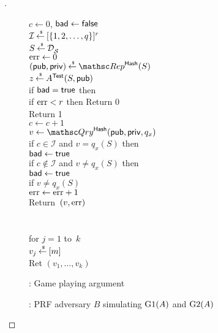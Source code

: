 \begin{proof}[]
\begin{figure}
{{$c\gets 0$, $\mathsf{bad} \gets \mathsf{false}$\\
$\mathcal{I}{\:\stackrel{{\scriptscriptstyle \hspace{0.2em}\$}} {\leftarrow}\:} [\{1,2,\ldots,q\}]^r$\\
$S {\:\stackrel{{\scriptscriptstyle \hspace{0.2em}\$}} {\leftarrow}\:} \mathcal{D}_{{\cal S}}^{}$\\
$\mathrm{err} \gets 0$\\
$(\pubaux,\privaux) \getsr \Rep^{\HashOracle}(S)$\\
$z {\:\stackrel{{\scriptscriptstyle \hspace{0.2em}\$}} {\leftarrow}\:} A^{\mathsf{Test}}(S,{\sf pub})$\\
if $\mathsf{bad} = \mathsf{true}$ then \\
if $\mathrm{err}  < r$ then Return 0\\
Return 1
}
%
{
\\
$c \gets c+1$\\
$v \gets \Qry^{\HashOracle}(\pubaux,\privaux,q_x)$\\
if $c \in \mathcal{I}$ and $v = q_x(S)$ then \\
\nudge $\mathsf{bad} \gets \mathsf{true}$ \\
if $c \not\in \mathcal{I}$ and $v \neq q_x(S)$ then \\
\nudge $\mathsf{bad} \gets \mathsf{true}$\\
if $v \neq q_x(S)$\\
\nudge $\mathrm{err} \gets\mathrm{err} +1$\\
Return~$(v,\mathrm{err} )$\\\\
%
\\
for $j = 1$ to~$k$\\
\nudge $v_j {\:\stackrel{{\scriptscriptstyle \hspace{0.2em}\$}} {\leftarrow}\:} [m]$\\
Ret $\left(v_1,\ldots,v_k\right)$
}
}
\caption{: Game playing argument}\label{fig:2TGame}
\end{figure}

\begin{figure}
\centering
{}
\caption{: PRF adversary $B$ simulating $\text{G1}(A)$ and $\text{G2}(A)$} \label{fig:2TD}
\end{figure}	


\end{proof}
